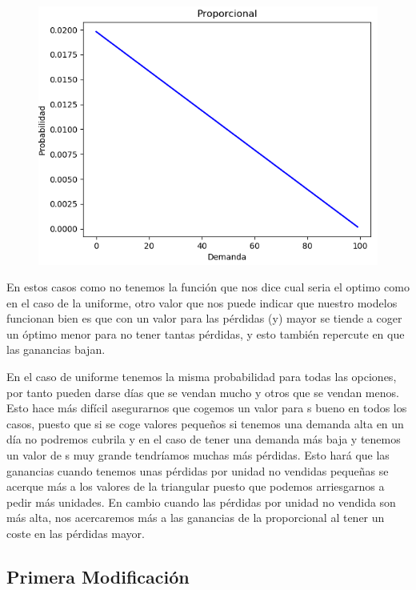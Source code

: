 \documentclass[]{article}
\begin{document}
\begin{figure}[H]
	\centering
	\includegraphics[width=1\linewidth]{img/screenshot001}
	\caption{}
	\label{fig:screenshot001}
\end{figure}
En estos casos como no tenemos la función que nos dice cual seria el optimo como en el caso de la uniforme, otro valor que nos puede indicar que nuestro modelos funcionan bien es que con un valor para las pérdidas (y) mayor se tiende a coger un óptimo menor para no tener tantas pérdidas, y esto también repercute en que las ganancias bajan.
\newline

En el caso de uniforme tenemos la misma probabilidad para todas las opciones, por tanto pueden darse días que se vendan mucho y otros que se vendan menos. Esto hace más difícil asegurarnos que cogemos un valor para s bueno en todos los casos, puesto que si se coge valores pequeños si tenemos una demanda alta en un día no podremos cubrila y en el caso de tener una demanda más baja y tenemos un valor de s muy grande tendríamos muchas más pérdidas. Esto hará que las  ganancias cuando tenemos unas pérdidas por unidad no vendidas pequeñas se acerque más a los valores de la triangular puesto que podemos arriesgarnos a pedir más unidades. En cambio cuando las pérdidas por unidad no vendida son más alta, nos acercaremos más a las ganancias de la proporcional al tener un coste en las pérdidas mayor.

\subsection{Primera Modificación}
\end{document}
